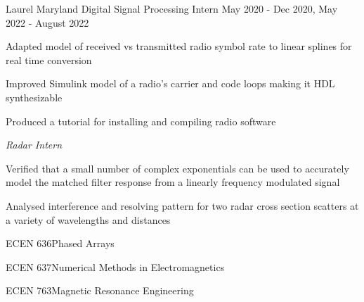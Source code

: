 \documentclass[11pt]{article} %
\begin{document}

\begin{description}
\squish

	   {Laurel Maryland}
           {Digital Signal Processing Intern}
           {May 2020 - Dec 2020, May 2022 - August 2022}

	   Adapted model of received  vs transmitted radio symbol rate to linear splines for real time conversion

	   Improved Simulink model of a radio's carrier and code loops making it HDL synthesizable

	   Produced a tutorial for installing and compiling radio software


		\emph{Radar Intern}

		Verified that a small number of complex exponentials can be used to accurately model the matched filter response from a linearly frequency modulated signal

		Analysed interference and resolving pattern for two radar cross section scatters at a variety of wavelengths and distances 



%
%
%

%
%

\end{description}


 {ECEN 636}{Phased Arrays}

 {ECEN 637}{Numerical Methods in Electromagnetics}

 {ECEN 763}{Magnetic Resonance Engineering }


% 
\end{document}
